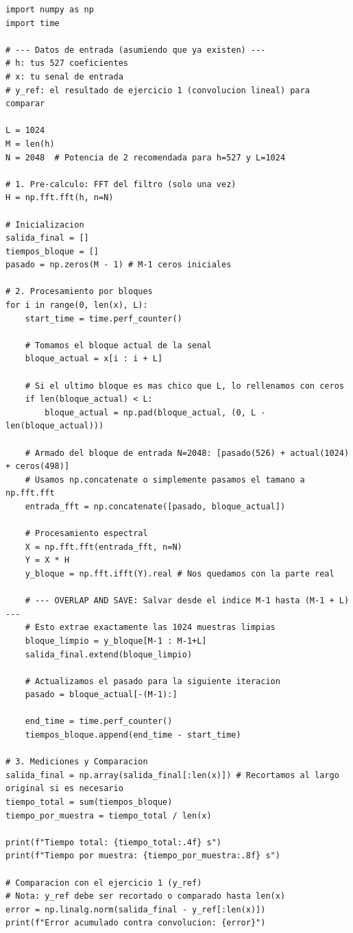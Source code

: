 \vspace{0.5cm}
\begin{lstlisting}[style=mystyle, caption={Código empleado en la implementación.}, label={lst:filtro + ds}]
import numpy as np
import time

# --- Datos de entrada (asumiendo que ya existen) ---
# h: tus 527 coeficientes
# x: tu senal de entrada
# y_ref: el resultado de ejercicio 1 (convolucion lineal) para comparar

L = 1024
M = len(h)
N = 2048  # Potencia de 2 recomendada para h=527 y L=1024

# 1. Pre-calculo: FFT del filtro (solo una vez)
H = np.fft.fft(h, n=N)

# Inicializacion
salida_final = []
tiempos_bloque = []
pasado = np.zeros(M - 1) # M-1 ceros iniciales

# 2. Procesamiento por bloques
for i in range(0, len(x), L):
    start_time = time.perf_counter()
    
    # Tomamos el bloque actual de la senal
    bloque_actual = x[i : i + L]
    
    # Si el ultimo bloque es mas chico que L, lo rellenamos con ceros
    if len(bloque_actual) < L:
        bloque_actual = np.pad(bloque_actual, (0, L - len(bloque_actual)))
    
    # Armado del bloque de entrada N=2048: [pasado(526) + actual(1024) + ceros(498)]
    # Usamos np.concatenate o simplemente pasamos el tamano a np.fft.fft
    entrada_fft = np.concatenate([pasado, bloque_actual])
    
    # Procesamiento espectral
    X = np.fft.fft(entrada_fft, n=N)
    Y = X * H
    y_bloque = np.fft.ifft(Y).real # Nos quedamos con la parte real
    
    # --- OVERLAP AND SAVE: Salvar desde el indice M-1 hasta (M-1 + L) ---
    # Esto extrae exactamente las 1024 muestras limpias
    bloque_limpio = y_bloque[M-1 : M-1+L]
    salida_final.extend(bloque_limpio)
    
    # Actualizamos el pasado para la siguiente iteracion
    pasado = bloque_actual[-(M-1):]
    
    end_time = time.perf_counter()
    tiempos_bloque.append(end_time - start_time)

# 3. Mediciones y Comparacion
salida_final = np.array(salida_final[:len(x)]) # Recortamos al largo original si es necesario
tiempo_total = sum(tiempos_bloque)
tiempo_por_muestra = tiempo_total / len(x)

print(f"Tiempo total: {tiempo_total:.4f} s")
print(f"Tiempo por muestra: {tiempo_por_muestra:.8f} s")

# Comparacion con el ejercicio 1 (y_ref)
# Nota: y_ref debe ser recortado o comparado hasta len(x)
error = np.linalg.norm(salida_final - y_ref[:len(x)])
print(f"Error acumulado contra convolucion: {error}")
\end{lstlisting}

